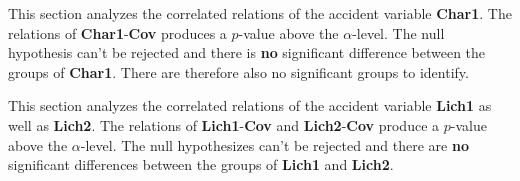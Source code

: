 This section analyzes the correlated relations of the accident variable \textbf{Char1}. The relations of \textbf{Char1}-\textbf{Cov} produces a $p$-value above the $\alpha$-level. The null hypothesis can't be rejected and there is \textbf{no} significant difference between the groups of \textbf{Char1}. There are therefore also no significant groups to identify.


This section analyzes the correlated relations of the accident variable \textbf{Lich1} as well as \textbf{Lich2}. The relations of \textbf{Lich1}-\textbf{Cov} and \textbf{Lich2}-\textbf{Cov} produce a $p$-value above the $\alpha$-level. The null hypothesizes can't be rejected and there are \textbf{no} significant differences between the groups of \textbf{Lich1} and \textbf{Lich2}.




